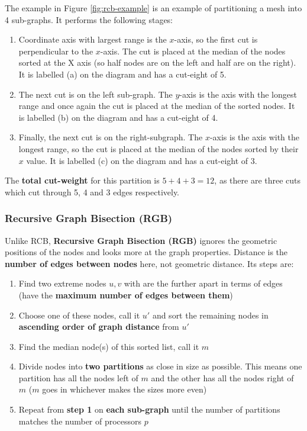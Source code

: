 \documentclass{article}
\begin{document}
The example in Figure \ref{fig:rcb-example} is an example of partitioning a mesh into 4 sub-graphs. It performs the following stages:
\begin{enumerate}
	\item Coordinate axis with largest range is the $x$-axis, so the first cut is perpendicular to the $x$-axis. The cut is placed at the median of the nodes sorted at the X axis (so half nodes are on the left and half are on the right). It is labelled (a) on the diagram and has a cut-eight of 5.
	\item The next cut is on the left sub-graph. The $y$-axis is the axis with the longest range and once again the cut is placed at the median of the sorted nodes. It is labelled (b) on the diagram and has a cut-eight of 4.
	\item Finally, the next cut is on the right-subgraph. The $x$-axis is the axis with the longest range, so the cut is placed at the median of the nodes sorted by their $x$ value. It is labelled (c) on the diagram and has a cut-eight of 3.
\end{enumerate}
The \textbf{total cut-weight} for this partition is $5 + 4 + 3 = 12$, as there are three cuts which cut through 5, 4 and 3 edges respectively.

\subsubsection{Recursive Graph Bisection (RGB)}

Unlike RCB, \textbf{Recursive Graph Bisection (RGB)} ignores the geometric positions of the nodes and looks more at the graph properties. Distance is the \textbf{number of edges between nodes} here, not geometric distance. Its steps are:
\begin{enumerate}
	\item Find two extreme nodes $u,v$ with are the further apart in terms of edges (have the \textbf{maximum number of edges between them})
	\item Choose one of these nodes, call it $u'$ and sort the remaining nodes in \textbf{ascending order of graph distance} from $u'$
	\item Find the median node(s) of this sorted list, call it $m$
	\item Divide nodes into \textbf{two partitions} as close in size as possible. This means one partition has all the nodes left of $m$ and the other has all the nodes right of $m$ ($m$ goes in whichever makes the sizes more even)
	\item Repeat from \textbf{step 1} on \textbf{each sub-graph} until the number of partitions matches the number of processors $p$
\end{enumerate}
\end{document}
